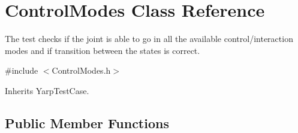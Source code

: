 \section{Control\+Modes Class Reference}
\label{classControlModes}


The test checks if the joint is able to go in all the available control/interaction modes and if transition between the states is correct.  




{\ttfamily \#include $<$Control\+Modes.\+h$>$}



Inherits Yarp\+Test\+Case.

\subsection*{Public Member Functions}
